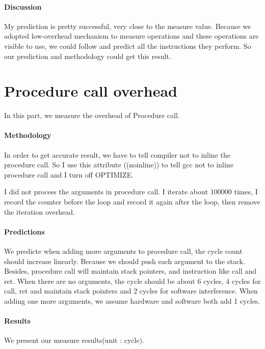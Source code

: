 \paragraph{Discussion}
My prediction is pretty successful, very close to the measure value. Because we adopted low-overhead mechanism to measure operations and these operations are visible to use, we could follow and predict all the instructions they perform. So our prediction and methodology could get this result. 

\section{Procedure call overhead}
In this part, we measure the overhead of Procedure call. 

\paragraph{Methodology}
In order to get accurate result, we have to tell compiler not to inline the procedure call. So I use this attribute ((noinline)) to tell gcc not to inline procedure call and I turn off OPTIMIZE.

I did not process the arguments in procedure call. I iterate about 100000 times, I record the counter before the loop and record it again after the loop, then remove the iteration overhead.

\paragraph{Predictions}
We predicte when adding more arguments to procedure call, the cycle count should increase linearly. Because we should push each argument to the stack. Besides, procedure call will maintain stack pointers, and instruction like call and ret. When there are no arguments, the cycle should be about 6 cycles, 4 cycles for call, ret and maintain stack pointers and 2 cycles for software interference. When adding one more arguments, we assume hardware and software both add 1 cycles.


\paragraph{Results}
We present our measure results(unit : cycle).

